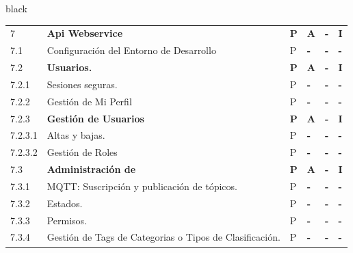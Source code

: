 \documentclass[11pt]{charter}
\begin{document}
\begin{landscape}
\begin{consigna}{black}
\begin{tabularx}{\linewidth}{@{}|p{1.3cm}|p{9.3cm}|p{3cm}|p{3cm}|p{3cm}|p{3cm}|@{}}
7                      & \textbf{Api Webservice}                                                                       & \textbf{P} & \textbf{A} & \textbf{-} & \textbf{I} \\
7.1                    & Configuración del Entorno de   Desarrollo                                                     & P          & \textbf{-} & \textbf{-} & \textbf{-} \\
7.2                    & \textbf{Usuarios.}                                                                            & \textbf{P} & \textbf{A} & \textbf{-} & \textbf{I} \\
7.2.1                  & Sesiones seguras.                                                                             & P          & \textbf{-} & \textbf{-} & \textbf{-} \\
7.2.2                  & Gestión de Mi Perfil                                                                          & P          & \textbf{-} & \textbf{-} & \textbf{-} \\
7.2.3                  & \textbf{Gestión de Usuarios}                                                                  & \textbf{P} & \textbf{A} & \textbf{-} & \textbf{I} \\
7.2.3.1                & Altas y bajas.                                                                                & P          & \textbf{-} & \textbf{-} & \textbf{-} \\
7.2.3.2                & Gestión de Roles                                                                              & P          & \textbf{-} & \textbf{-} & \textbf{-} \\
7.3                    & \textbf{Administración de}                                                                    & \textbf{P} & \textbf{A} & \textbf{-} & \textbf{I} \\
7.3.1                  & MQTT: Suscripción y publicación   de tópicos.                                                 & P          & \textbf{-} & \textbf{-} & \textbf{-} \\
7.3.2                  & Estados.                                                                                      & P          & \textbf{-} & \textbf{-} & \textbf{-} \\
7.3.3                  & Permisos.                                                                                     & P          & \textbf{-} & \textbf{-} & \textbf{-} \\
7.3.4                  & Gestión de Tags de Categorias o   Tipos de Clasificación.                                     & P          & \textbf{-} & \textbf{-} & \textbf{-} \\

\end{tabularx}
\end{consigna}
\end{landscape}
\end{document}
